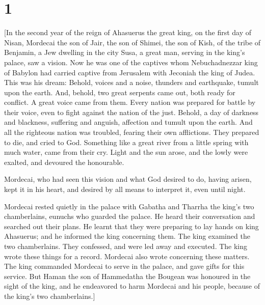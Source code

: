 \hypertarget{section}{%
\section{1}\label{section}}

 {[}In the second year of the reign of Ahasuerus the great
king, on the first day of Nisan, Mordecai the son of Jair, the son of
Shimei, the son of Kish, of the tribe of Benjamin, a Jew dwelling in the
city Susa, a great man, serving in the king's palace, saw a vision. Now
he was one of the captives whom Nebuchadnezzar king of Babylon had
carried captive from Jerusalem with Jeconiah the king of Judea. This was
his dream: Behold, voices and a noise, thunders and earthquake, tumult
upon the earth. And, behold, two great serpents came out, both ready for
conflict. A great voice came from them. Every nation was prepared for
battle by their voice, even to fight against the nation of the just.
Behold, a day of darkness and blackness, suffering and anguish,
affection and tumult upon the earth. And all the righteous nation was
troubled, fearing their own afflictions. They prepared to die, and cried
to God. Something like a great river from a little spring with much
water, came from their cry. Light and the sun arose, and the lowly were
exalted, and devoured the honourable.

Mordecai, who had seen this vision and what God desired to do, having
arisen, kept it in his heart, and desired by all means to interpret it,
even until night.

Mordecai rested quietly in the palace with Gabatha and Tharrha the
king's two chamberlains, eunuchs who guarded the palace. He heard their
conversation and searched out their plans. He learnt that they were
preparing to lay hands on king Ahasuerus; and he informed the king
concerning them. The king examined the two chamberlains. They confessed,
and were led away and executed. The king wrote these things for a
record. Mordecai also wrote concerning these matters. The king commanded
Mordecai to serve in the palace, and gave gifts for this service. But
Haman the son of Hammedatha the Bougean was honoured in the sight of the
king, and he endeavored to harm Mordecai and his people, because of the
king's two chamberlains.{]}

